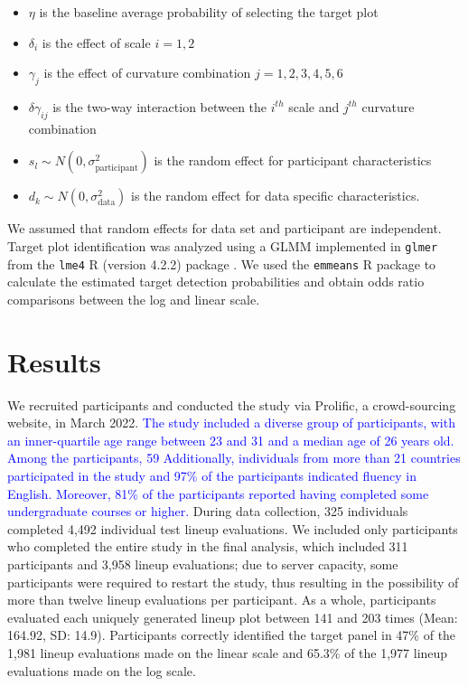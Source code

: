 \documentclass[12pt]{article}
\begin{document}
\begin{itemize}
\item $\eta$ is the baseline average probability of selecting the target plot
\item $\delta_i$ is the effect of scale $i = 1,2$
\item $\gamma_j$ is the effect of curvature combination $j = 1,2,3,4,5,6$
\item $\delta\gamma_{ij}$ is the two-way interaction between the $i^{th}$ scale and $j^{th}$ curvature combination
\item $s_l \sim N(0,\sigma^2_\text{participant})$ is the random effect for participant characteristics
\item $d_k \sim N(0,\sigma^2_{\text{data}})$ is the random effect for data specific characteristics. 
\end{itemize}

\noindent We assumed that random effects for data set and participant
are independent. Target plot identification was analyzed using a GLMM
implemented in \texttt{glmer} from the \texttt{lme4} R (version 4.2.2)
package \citep{lme4}. We used the \texttt{emmeans} R package
\citep{emmeans} to calculate the estimated target detection
probabilities and obtain odds ratio comparisons between the log and
linear scale.

\hypertarget{results}{%
\section{Results}\label{results}}

We recruited participants and conducted the study via Prolific, a
crowd-sourcing website, in March 2022.
{\textcolor{blue}{The study included a diverse group of participants, with an inner-quartile age range between 23 and 31 and a median age of 26 years old. Among the participants, 59%
Additionally, individuals from more than 21 countries participated in the study and 97\% of the participants indicated fluency in English. 
Moreover, 81\% of the participants reported having completed some undergraduate courses or higher.}}
During data collection, 325 individuals completed 4,492 individual test
lineup evaluations. We included only participants who completed the
entire study in the final analysis, which included 311 participants and
3,958 lineup evaluations; due to server capacity, some participants were
required to restart the study, thus resulting in the possibility of more
than twelve lineup evaluations per participant. As a whole, participants
evaluated each uniquely generated lineup plot between 141 and 203 times
(Mean: 164.92, SD: 14.9). Participants correctly identified the target
panel in 47\% of the 1,981 lineup evaluations made on the linear scale
and 65.3\% of the 1,977 lineup evaluations made on the log scale.
\end{document}
